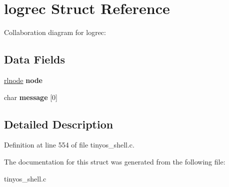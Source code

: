 \hypertarget{structlogrec}{}\section{logrec Struct Reference}
\label{structlogrec}


Collaboration diagram for logrec\+:
\subsection*{Data Fields}
\begin{DoxyCompactItemize}
\item 
\hyperlink{group__rlists_ga8f6244877f7ce2322c90525217ea6e7a}{rlnode} {\bfseries node}\hypertarget{structlogrec_ab1f7006e72b67ba7b9d0b26713997aa5}{}\label{structlogrec_ab1f7006e72b67ba7b9d0b26713997aa5}

\item 
char {\bfseries message} \mbox{[}0\mbox{]}\hypertarget{structlogrec_ad21f53e0393fccb77219c1d9d94b7d23}{}\label{structlogrec_ad21f53e0393fccb77219c1d9d94b7d23}

\end{DoxyCompactItemize}


\subsection{Detailed Description}


Definition at line 554 of file tinyos\+\_\+shell.\+c.



The documentation for this struct was generated from the following file\+:\begin{DoxyCompactItemize}
\item 
tinyos\+\_\+shell.\+c\end{DoxyCompactItemize}
